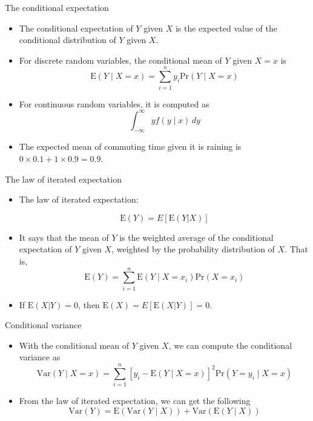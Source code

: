 \documentclass[presentation]{beamer}
\begin{document}
\begin{frame}[label={sec:org73c9778}]{The conditional expectation}
\begin{itemize}
\item The \alert{conditional expectation} of \(Y\) given \(X\) is the expected value
of the conditional distribution of \(Y\) given \(X\).

\item For discrete random variables, the conditional mean of \(Y\) given \(X=x\) is
\begin{equation*}
\mathrm{E}(Y \mid X=x) = \sum_{i=1}^n y_i \mathrm{Pr}(Y \mid X=x)
\end{equation*}

\item For continuous random variables, it is computed as
\begin{equation*}
\int_{-\infty}^{\infty} y f(y \mid x)\, dy
\end{equation*}

\item The expected mean of commuting time given it is raining is \(0 \times
  0.1 + 1 \times 0.9 = 0.9\).
\end{itemize}
\end{frame}

\begin{frame}[label={sec:orgb4c8e1b}]{The law of iterated expectation}
\begin{itemize}
\item \alert{The law of iterated expectation}:

\[ \mathrm{E}(Y) = E \left[ \mathrm{E}(Y|X) \right] \]

\item It says that the mean of \(Y\) is the weighted average of the
conditional expectation of \(Y\) given \(X\), weighted by the
probability distribution of \(X\). That is,
\[ \mathrm{E}(Y) = \sum_{i=1}^n \mathrm{E}(Y \mid X=x_i) \mathrm{Pr}(X=x_i) \]

\item If \(\mathrm{E}(X|Y) = 0\), then \(\mathrm{E}(X)=E\left[\mathrm{E}(X|Y)\right]=0\).
\end{itemize}
\end{frame}

\begin{frame}[label={sec:org4874f94}]{Conditional variance}
\begin{itemize}
\item With the conditional mean of \(Y\) given \(X\), we can compute the
conditional variance as
\[ \mathrm{Var}(Y \mid X=x) = \sum_{i=1}^n \left[ y_i - \mathrm{E}(Y \mid X=x)
  \right]^2 \mathrm{Pr}(Y=y_i \mid X=x) \]

\item From the law of iterated expectation, we can get the following
\[ \mathrm{Var}(Y) = \mathrm{E}(\mathrm{Var}(Y \mid X)) + \mathrm{Var}(\mathrm{E}(Y \mid
  X)) \]
\end{itemize}
\end{frame}
\end{document}
